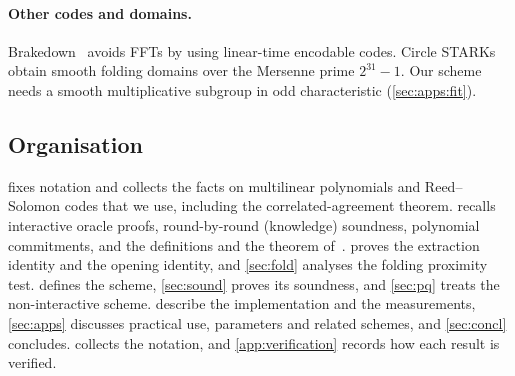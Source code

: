 \paragraph{Other codes and domains.}
Brakedown~\cite{GLSTW23} avoids FFTs by using linear-time encodable codes.
Circle STARKs~\cite{HLP24} obtain smooth folding domains over the Mersenne prime $2^{31}-1$.
Our scheme needs a smooth multiplicative subgroup in odd characteristic (\cref{sec:apps:fit}).

\subsection{Organisation}\label{sec:intro:org}

 fixes notation and collects the facts on multilinear polynomials and Reed--Solomon codes that we use, including the correlated-agreement theorem.
 recalls interactive oracle proofs, round-by-round (knowledge) soundness, polynomial commitments, and the definitions and the theorem of~\cite{CDHZ25}.
 proves the extraction identity and the opening identity, and \cref{sec:fold} analyses the folding proximity test.
 defines the scheme, \cref{sec:sound} proves its soundness, and \cref{sec:pq} treats the non-interactive scheme.
 describe the implementation and the measurements, \cref{sec:apps} discusses practical use, parameters and related schemes, and \cref{sec:concl} concludes.
 collects the notation, and \cref{app:verification} records how each result is verified.
